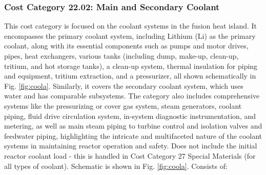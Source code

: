 \subsubsection{Cost Category 22.02: Main and Secondary Coolant} 

This cost category is focused on the coolant systems in the fusion heat island. It encompasses the primary coolant system, including Lithium (Li) as the primary coolant, along with its essential components such as pumps and motor drives, pipes, heat exchangers, various tanks (including dump, make-up, clean-up, tritium, and hot storage tanks), a clean-up system, thermal insulation for piping and equipment, tritium extraction, and a pressurizer, all shown schematically in Fig. \ref{fig:coola}. Similarly, it covers the secondary coolant system, which uses water and has comparable subsystems.  The category also includes comprehensive systems like the pressurizing or cover gas system, steam generators, coolant piping, fluid drive circulation system, in-system diagnostic instrumentation, and metering, as well as main steam piping to turbine control and isolation valves and feedwater piping, highlighting the intricate and multifaceted nature of the coolant systems in maintaining reactor operation and safety.  Does not include the initial reactor coolant load - this is handled in  Cost Category 27 Special Materials (for all types of coolant). Schematic is shown in Fig. \ref{fig:coola}. Consists of:

